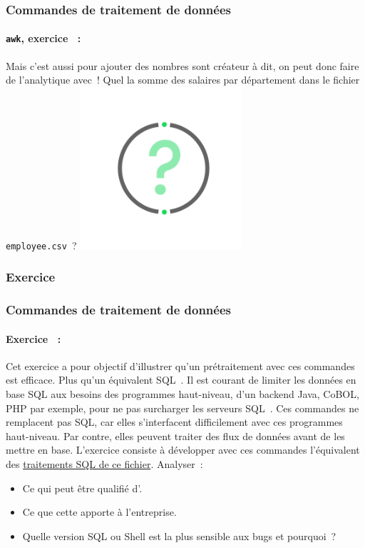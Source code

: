 \documentclass{beamer}
\begin{document}
    \begin{frame}
        \transdissolve
        \frametitle{Commandes de traitement de données}
        \framesubtitle{\lstinline{awk}, exercice \execcounterdispinc{}~:}
        Mais c'est aussi pour ajouter des nombres sont créateur à dit, on peut donc faire de l'analytique avec~!
        \bigbreak
        Quel la somme des salaires par département dans le fichier \lstinline{employee.csv}~?
        \bigbreak
        \centering
        \includegraphics[width=6cm]{image/question-mark}
    \end{frame}

    \subsubsection{Exercice}\label{subsubsec:data-exercice}
    \begin{frame}
        \transdissolve
        \frametitle{Commandes de traitement de données}
        \framesubtitle{Exercice \execcounterdispinc{}~:}
        Cet exercice a pour objectif d'illustrer qu'un prétraitement avec ces commandes est efficace.
        Plus qu'un équivalent SQL~.
        \bigbreak
        Il est courant de limiter les données en base SQL aux besoins des programmes haut-niveau, d'un backend Java, CoBOL, PHP par exemple, pour ne pas surcharger les serveurs SQL~.
        \bigbreak
        Ces commandes ne remplacent pas SQL, car elles s'interfacent difficilement avec ces programmes haut-niveau.
        \bigbreak
        Par contre, elles peuvent traiter des flux de données avant de les mettre en base.
        L'exercice consiste à développer avec ces commandes l'équivalent des \href{https://github.com/DigicompClassesByPapIT/linux2/blob/main/sqlite-hr.sh}{traitements SQL de ce fichier}.
        Analyser~:
        \begin{itemize}
            \item Ce qui peut être qualifié d'.
            \item Ce que cette  apporte à l'entreprise.
            \item Quelle version SQL ou Shell est la plus sensible aux bugs et pourquoi~?
        \end{itemize}
    \end{frame}
\end{document}
